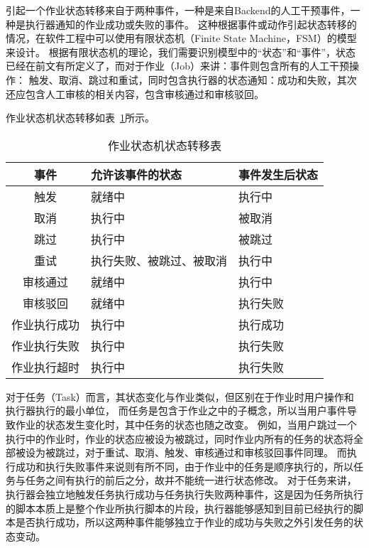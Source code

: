 引起一个作业状态转移来自于两种事件，一种是来自Backend的人工干预事件，一种是执行器通知的作业成功或失败的事件。
这种根据事件或动作引起状态转移的情况，在软件工程中可以使用有限状态机（Finite State Machine，FSM）的模型来设计。
根据有限状态机的理论，我们需要识别模型中的“状态”和“事件”，状态已经在前文有所定义了，而对于作业（Job）来讲：事件则包含所有的人工干预操作：
触发、取消、跳过和重试，同时包含执行器的状态通知：成功和失败，其次还应包含人工审核的相关内容，包含审核通过和审核驳回。

作业状态机状态转移如表~\ref{tab:作业状态机状态转移表}所示。

\begin{table}[h]
  \centering
  \caption{作业状态机状态转移表}
  \label{tab:作业状态机状态转移表}
  \begin{tabular}{cll}
    \toprule
    事件           & 允许该事件的状态          & 事件发生后状态                  \\
    \midrule
    触发           & 就绪中                   & 执行中       \\
    取消           & 执行中                   & 被取消       \\
    跳过           & 执行中                   & 被跳过       \\
    重试           & 执行失败、被跳过、被取消   & 执行中       \\
    审核通过        & 就绪中                   & 执行中        \\
    审核驳回        & 就绪中                   & 执行失败       \\
    作业执行成功     & 执行中      & 执行成功   \\
    作业执行失败     & 执行中      & 执行失败   \\
    作业执行超时     & 执行中      & 执行失败   \\
    \bottomrule
  \end{tabular}
\end{table}

对于任务（Task）而言，其状态变化与作业类似，但区别在于作业时用户操作和执行器执行的最小单位，
而任务是包含于作业之中的子概念，所以当用户事件导致作业的状态发生变化时，其中任务的状态也随之改变。
例如，当用户跳过一个执行中的作业时，作业的状态应被设为被跳过，同时作业内所有的任务的状态将全部被设为被跳过，对于重试、取消、触发、审核通过和审核驳回事件同理。
而执行成功和执行失败事件来说则有所不同，由于作业中的任务是顺序执行的，所以任务与任务之间有执行的前后之分，故并不能统一进行状态修改。
对于任务来讲，执行器会独立地触发任务执行成功与任务执行失败两种事件，这是因为任务所执行的脚本本质上是整个作业所执行脚本的片段，执行器能够感知到目前已经执行的脚本是否执行成功，所以这两种事件能够独立于作业的成功与失败之外引发任务的状态变动。

